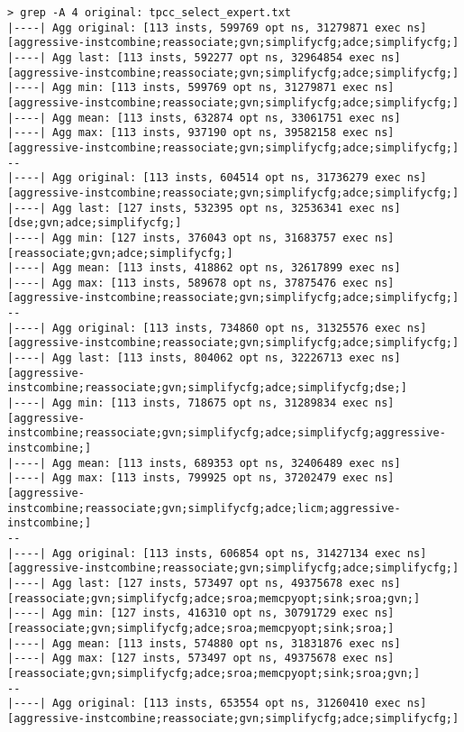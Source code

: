 \documentclass{vldb}
\begin{document}
\begin{lstlisting}[caption={Results of TPC-C Query with Expert Optimizations},label={lst:tpccexpertopt}]
> grep -A 4 original: tpcc_select_expert.txt  
|----| Agg original: [113 insts, 599769 opt ns, 31279871 exec ns] [aggressive-instcombine;reassociate;gvn;simplifycfg;adce;simplifycfg;]
|----| Agg last: [113 insts, 592277 opt ns, 32964854 exec ns] [aggressive-instcombine;reassociate;gvn;simplifycfg;adce;simplifycfg;]
|----| Agg min: [113 insts, 599769 opt ns, 31279871 exec ns] [aggressive-instcombine;reassociate;gvn;simplifycfg;adce;simplifycfg;]
|----| Agg mean: [113 insts, 632874 opt ns, 33061751 exec ns]
|----| Agg max: [113 insts, 937190 opt ns, 39582158 exec ns] [aggressive-instcombine;reassociate;gvn;simplifycfg;adce;simplifycfg;]
--
|----| Agg original: [113 insts, 604514 opt ns, 31736279 exec ns] [aggressive-instcombine;reassociate;gvn;simplifycfg;adce;simplifycfg;]
|----| Agg last: [127 insts, 532395 opt ns, 32536341 exec ns] [dse;gvn;adce;simplifycfg;]
|----| Agg min: [127 insts, 376043 opt ns, 31683757 exec ns] [reassociate;gvn;adce;simplifycfg;]
|----| Agg mean: [113 insts, 418862 opt ns, 32617899 exec ns]
|----| Agg max: [113 insts, 589678 opt ns, 37875476 exec ns] [aggressive-instcombine;reassociate;gvn;simplifycfg;adce;simplifycfg;]
--
|----| Agg original: [113 insts, 734860 opt ns, 31325576 exec ns] [aggressive-instcombine;reassociate;gvn;simplifycfg;adce;simplifycfg;]
|----| Agg last: [113 insts, 804062 opt ns, 32226713 exec ns] [aggressive-instcombine;reassociate;gvn;simplifycfg;adce;simplifycfg;dse;]
|----| Agg min: [113 insts, 718675 opt ns, 31289834 exec ns] [aggressive-instcombine;reassociate;gvn;simplifycfg;adce;simplifycfg;aggressive-instcombine;]
|----| Agg mean: [113 insts, 689353 opt ns, 32406489 exec ns]
|----| Agg max: [113 insts, 799925 opt ns, 37202479 exec ns] [aggressive-instcombine;reassociate;gvn;simplifycfg;adce;licm;aggressive-instcombine;]
--
|----| Agg original: [113 insts, 606854 opt ns, 31427134 exec ns] [aggressive-instcombine;reassociate;gvn;simplifycfg;adce;simplifycfg;]
|----| Agg last: [127 insts, 573497 opt ns, 49375678 exec ns] [reassociate;gvn;simplifycfg;adce;sroa;memcpyopt;sink;sroa;gvn;]
|----| Agg min: [127 insts, 416310 opt ns, 30791729 exec ns] [reassociate;gvn;simplifycfg;adce;sroa;memcpyopt;sink;sroa;]
|----| Agg mean: [113 insts, 574880 opt ns, 31831876 exec ns]
|----| Agg max: [127 insts, 573497 opt ns, 49375678 exec ns] [reassociate;gvn;simplifycfg;adce;sroa;memcpyopt;sink;sroa;gvn;]
--
|----| Agg original: [113 insts, 653554 opt ns, 31260410 exec ns] [aggressive-instcombine;reassociate;gvn;simplifycfg;adce;simplifycfg;]

\end{lstlisting}
\end{document}
